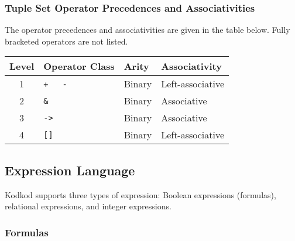 \documentclass[a4paper,12pt]{article}
\begin{document}
\subsubsection{Tuple Set Operator Precedences and Associativities}
\label{tuple-set-operator-precedences-and-associativities}

The operator precedences and associativities are given in the table below. Fully
bracketed operators are not listed.

\begin{center}
\small
\begin{supertabular}{c|l|l|l} %
Level & Operator Class & Arity & Associativity \\[.4ex]
\hline
\strut{}%
1 & \verb|+|~~~\verb|-| & Binary & Left-associative\bigstrut \\
2 & \verb|&| & Binary & Associative\bigstrut \\
3 & \verb|->| & Binary & Associative\bigstrut \\
4 & \verb|[]| & Binary & Left-associative\bigstrut \\
\end{supertabular}
\end{center}

\subsection{Expression Language}
\label{expression-language}

Kodkod supports three types of expression: Boolean expressions (formulas),
relational expressions, and integer expressions.

\subsubsection{Formulas}
\label{formulas}
\end{document}
